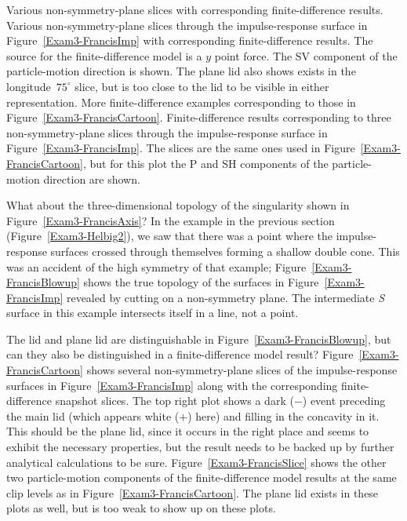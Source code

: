 {Various non-symmetry-plane slices with corresponding
finite-difference results.}
{
Various non-symmetry-plane slices through the impulse-response surface
in Figure~\protect\ref{Exam3-FrancisImp} with corresponding
finite-difference results. The source for the finite-difference model
is a $y$ point force. The SV component of the particle-motion
direction is shown.
The plane lid also shows exists in
the longitude~$75^\circ$ slice, but is too close to the lid to be
visible in either representation.
}
{More finite-difference examples
corresponding to those in Figure~\protect\ref{Exam3-FrancisCartoon}.}
{
Finite-difference results corresponding to three non-symmetry-plane
slices through the impulse-response surface
in Figure~\protect\ref{Exam3-FrancisImp}.
The slices are the same ones
used in Figure~\protect\ref{Exam3-FrancisCartoon},
but for this plot the P and SH components of the particle-motion
direction are shown.
}

What about the three-dimensional topology of the singularity shown
in Figure~\ref{Exam3-FrancisAxis}?
In the example in the previous section (Figure~\ref{Exam3-Helbig2}),
we saw that there was a point where the impulse-response surfaces
crossed through themselves forming a shallow double cone.
This was an accident of the high
symmetry of that example; Figure~\ref{Exam3-FrancisBlowup} shows
the true topology of the surfaces in Figure~\ref{Exam3-FrancisImp}
revealed by cutting on a non-symmetry plane. The intermediate {\sl S}
surface in this example intersects itself in a line, not a point.

The lid and plane lid are distinguishable in Figure~\ref{Exam3-FrancisBlowup},
but can they also be distinguished in a finite-difference model result?
Figure~\ref{Exam3-FrancisCartoon} shows several non-symmetry-plane slices
of the impulse-response surfaces in Figure~\ref{Exam3-FrancisImp}
along with the corresponding finite-difference snapshot slices.
The top right plot shows a dark ($-$) event preceding
the main lid (which appears white ($+$) here)
and filling in the concavity in it.
This should be the plane lid, since it occurs in the right place
and seems to exhibit the necessary properties, but the result needs
to be backed up by further analytical calculations to be sure.
Figure~\ref{Exam3-FrancisSlice} shows the other two particle-motion
components of the finite-difference model results
at the same clip levels as in Figure~\ref{Exam3-FrancisCartoon}.
The plane lid exists in these plots as well, but is too weak to show
up on these plots.

